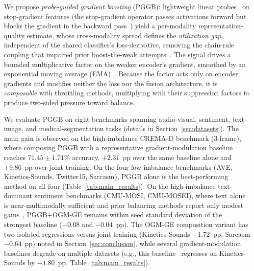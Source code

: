 \documentclass{article} %
\begin{document}
We propose \emph{probe-guided gradient boosting} (PGGB): lightweight linear probes~\citep{alain2017understanding} on stop-gradient features (the stop-gradient operator passes activations forward but blocks the gradient in the backward pass~\citep{vandenoord2017vqvae}) yield a per-modality representation-quality estimate, whose cross-modality spread defines the \emph{utilization gap}, independent of the shared classifier's loss-derivative, removing the chain-rule coupling that impaired prior boost-the-weak attempts~\citep{wei2024opm}. The signal drives a bounded multiplicative factor on the weaker encoder's gradient, smoothed by an exponential moving average (EMA)~\citep{tarvainen2017mean}. Because the factor acts only on encoder gradients and modifies neither the loss nor the fusion architecture, it is \emph{composable} with throttling methods, multiplying with their suppression factors to produce two-sided pressure toward balance.


We evaluate PGGB on eight benchmarks spanning audio-visual, sentiment, text-image, and medical-segmentation tasks (details in Section~\ref{sec:datasets}). The main gain is observed on the high-imbalance CREMA-D benchmark (3-frame), where composing PGGB with a representative gradient-modulation baseline~\citep{peng2022ogmge} reaches $71.45 \pm 1.71\%$ accuracy, $+2.31$~pp over the same baseline alone and $+9.86$~pp over joint training. On the four low-imbalance benchmarks (AVE, Kinetics-Sounds, Twitter15, Sarcasm), PGGB alone is the best-performing method on all four (Table~\ref{tab:main_results}). On the high-imbalance text-dominant sentiment benchmarks (CMU-MOSI, CMU-MOSEI), where text alone is near-multimodally sufficient and prior balancing methods report only modest gains~\citep{li2023agm,wei2025dgl}, PGGB+OGM-GE remains within seed standard deviation of the strongest baseline ($-0.08$ and $-0.04$~pp). The OGM-GE composition variant has two isolated regressions versus joint training (Kinetics-Sounds $-1.72$~pp, Sarcasm $-0.64$~pp) noted in Section~\ref{sec:conclusion}, while several gradient-modulation baselines degrade on multiple datasets (e.g., this baseline~\citep{peng2022ogmge} regresses on Kinetics-Sounds by $-1.80$~pp, Table~\ref{tab:main_results}).

\end{document}
